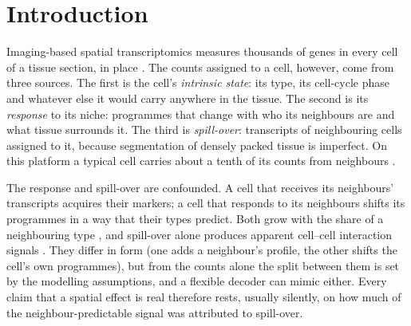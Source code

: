 \section{Introduction}
\label{sec:intro}

Imaging-based spatial transcriptomics measures thousands of genes in every cell of a tissue section, in place \citep{janesick2023}. The counts assigned to a cell, however, come from three sources. The first is the cell's \emph{intrinsic state}: its type, its cell-cycle phase and whatever else it would carry anywhere in the tissue. The second is its \emph{response} to its niche: programmes that change with who its neighbours are and what tissue surrounds it. The third is \emph{spill-over}: transcripts of neighbouring cells assigned to it, because segmentation of densely packed tissue is imperfect. On this platform a typical cell carries about a tenth of its counts from neighbours \citep{yang2025mistic}.

The response and spill-over are confounded. A cell that receives its neighbours' transcripts acquires their markers; a cell that responds to its neighbours shifts its programmes in a way that their types predict. Both grow with the share of a neighbouring type \citep{bilous2026split}, and spill-over alone produces apparent cell--cell interaction signals \citep{mitchel2026celladmix}. They differ in form (one adds a neighbour's profile, the other shifts the cell's own programmes), but from the counts alone the split between them is set by the modelling assumptions, and a flexible decoder can mimic either. Every claim that a spatial effect is real therefore rests, usually silently, on how much of the neighbour-predictable signal was attributed to spill-over.

